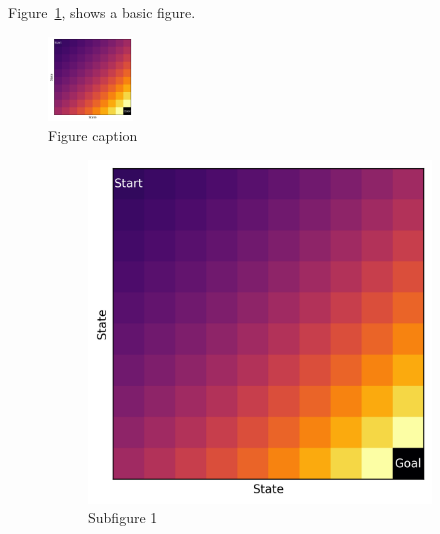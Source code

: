 Figure~\ref{fig:figure1}, shows a basic figure.

\begin{figure}[htb]
    \centering
    \includegraphics[width=0.2\textwidth]{assets/2d.png}
    \caption{Figure caption}
    \label{fig:figure1}
\end{figure}

\begin{figure}[htb]
    \centering
    \begin{subfigure}[t]{0.2\textwidth}
        \centering
        \includegraphics[width=\textwidth]{assets/2d.png}
        \caption{Subfigure 1}
    \end{subfigure}
    \hspace{1cm}
    \begin{subfigure}[t]{0.20\textwidth}
        \centering

\end{subfigure}
\end{figure}
